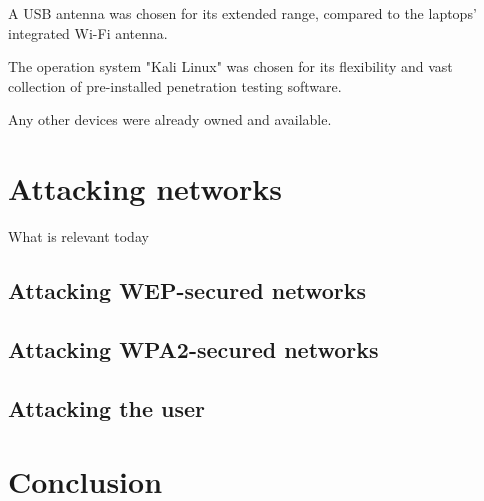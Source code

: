 A USB antenna was chosen for its extended range, compared to the laptops' integrated Wi-Fi antenna.

The operation system "Kali Linux" was chosen for its flexibility and vast collection of pre-installed penetration testing software.

Any other devices were already owned and available.

\section{Attacking networks}

What is relevant today

\subsection{Attacking WEP-secured networks}

\subsection{Attacking WPA2-secured networks}

\subsection{Attacking the user}

\section{Conclusion}